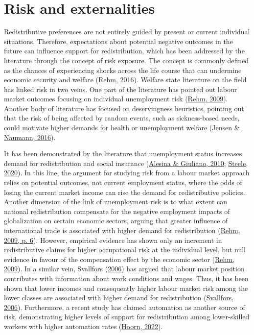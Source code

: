\documentclass[
  12pt,
]{book}
\begin{document}
\hypertarget{risk-and-externalities}{%
\section{Risk and externalities}\label{risk-and-externalities}}

Redistributive preferences are not entirely guided by present or current individual situations. Therefore, expectations about potential negative outcomes in the future can influence support for redistribution, which has been addressed by the literature through the concept of risk exposure. The concept is commonly defined as the chances of experiencing shocks across the life course that can undermine economic security and welfare (\protect\hyperlink{ref-rehm_risk_2016}{Rehm, 2016}). Welfare state literature on the field has linked risk in two veins. One part of the literature has pointed out labour market outcomes focusing on individual unemployment risk (\protect\hyperlink{ref-rehm_risks_2009}{Rehm, 2009}). Another body of literature has focused on deservingness heuristics, pointing out that the risk of being affected by random events, such as sickness-based needs, could motivate higher demands for health or unemployment welfare (\protect\hyperlink{ref-Jensenux5cux26Nauman2016}{Jensen \& Naumann, 2016}).

It has been demonstrated by the literature that unemployment status increases demand for redistribution and social insurance (\protect\hyperlink{ref-alesina_preferences_2010}{Alesina \& Giuliano, 2010}; \protect\hyperlink{ref-steele_wealth_2020}{Steele, 2020}). In this line, the argument for studying risk from a labour market approach relies on potential outcomes, not current employment status, where the odds of losing the current market income can rise the demand for redistributive policies. Another dimension of the link of unemployment risk is to what extent can national redistribution compensate for the negative employment impacts of globalization on certain economic sectors, arguing that greater influence of international trade is associated with higher demand for redistribution (\protect\hyperlink{ref-rehm_risks_2009}{Rehm, 2009, p. 6}). However, empirical evidence has shown only an increment in redistributive claims for higher occupational risk at the individual level, but null evidence in favour of the compensation effect by the economic sector (\protect\hyperlink{ref-rehm_risks_2009}{Rehm, 2009}). In a similar vein, Svallfors (\protect\hyperlink{ref-Svallfors2006}{2006}) has argued that labour market position contributes with information about work conditions and wages. Thus, it has been shown that lower incomes and consequently higher labour market risk among the lower classes are associated with higher demand for redistribution (\protect\hyperlink{ref-Svallfors2006}{Svallfors, 2006}). Furthermore, a recent study has claimed automation as another source of risk, demonstrating higher levels of support for redistribution among lower-skilled workers with higher automation rates (\protect\hyperlink{ref-hoorn_automatability_2022}{Hoorn, 2022}).
\end{document}
